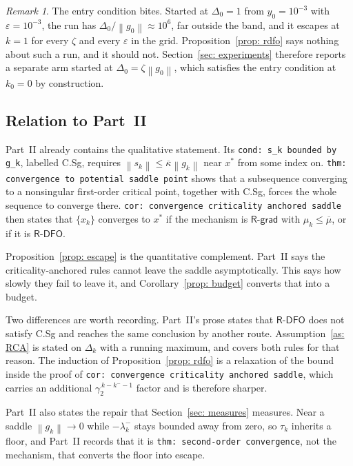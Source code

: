 \documentclass[11pt,a4paper]{article}
\providecommand{\kbar}{\overline{\kappa}}
\providecommand{\norm}[1]{\left \lVert #1 \right \rVert}
\providecommand{\Rdfo}{\textsf{R-DFO}}
\providecommand{\Rgrad}{\textsf{R-grad}}
\providecommand{\gtwo}{\gamma_2}
\theoremstyle{definition}
\theoremstyle{remark}
\newtheorem{remark}{Remark}
\begin{document}
\begin{remark}
  The entry condition bites. Started at $\Delta_0 = 1$ from $y_0 = 10^{-3}$ with
  $\varepsilon = 10^{-3}$, the run has $\Delta_0/\norm{g_0} \approx 10^{6}$, far
  outside the band, and it escapes at $k = 1$ for every $\zeta$ and every
  $\varepsilon$ in the grid. Proposition~\ref{prop: rdfo} says nothing about such
  a run, and it should not. Section~\ref{sec: experiments} therefore reports a
  separate arm started at $\Delta_0 = \zeta\norm{g_0}$, which satisfies the entry
  condition at $k_0 = 0$ by construction.
\end{remark}

\subsection{Relation to Part~II}\label{sec: partII}

Part~II already contains the qualitative statement. Its
\texttt{cond: s\_k bounded by g\_k}, labelled C.Sg, requires
$\norm{s_k} \leq \kbar\norm{g_k}$ near $x^*$ from some index on.
\texttt{thm: convergence to potential saddle point} shows that a subsequence
converging to a nonsingular first-order critical point, together with C.Sg,
forces the whole sequence to converge there.
\texttt{cor: convergence criticality anchored saddle} then states that
$\{x_k\}$ converges to $x^*$ if the mechanism is $\Rgrad$ with
$\mu_k \leq \overline{\mu}$, or if it is $\Rdfo$.

Proposition~\ref{prop: escape} is the quantitative complement. Part~II says the
criticality-anchored rules cannot leave the saddle asymptotically. This says how
slowly they fail to leave it, and Corollary~\ref{prop: budget} converts that into
a budget.

Two differences are worth recording. Part~II's prose states that $\Rdfo$ does not
satisfy C.Sg and reaches the same conclusion by another route.
Assumption~\ref{as: RCA} is stated on $\Delta_k$ with a running maximum, and
covers both rules for that reason. The induction of
Proposition~\ref{prop: rdfo} is a relaxation of the bound inside the proof of
\texttt{cor: convergence criticality anchored saddle}, which carries an
additional $\gtwo^{\,k-k^--1}$ factor and is therefore sharper.

Part~II also states the repair that Section~\ref{sec: measures} measures. Near a
saddle $\norm{g_k} \to 0$ while $-\lambda^-_k$ stays bounded away from zero, so
$\tau_k$ inherits a floor, and Part~II records that it is
\texttt{thm: second-order convergence}, not the mechanism, that converts the
floor into escape.
\end{document}

